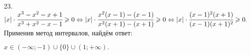 23. $|x|\cdot\cfrac{x^3-x^2-x+1}{x^3+x^2-x-1}\geqslant 0\Leftrightarrow|x|\cdot\cfrac{x^2(x-1)-(x-1)}{x^2(x+1)-(x+1)}\geqslant 0\Leftrightarrow
|x|\cdot\cfrac{(x-1)^2(x+1)}{(x-1)(x+1)^2}\geqslant 0.$
Применив метод интервалов, найдём ответ:
\begin{figure}[ht!]
\end{figure}
$x\in(-\infty;-1)\cup\{0\}\cup(1;+\infty).$\\

